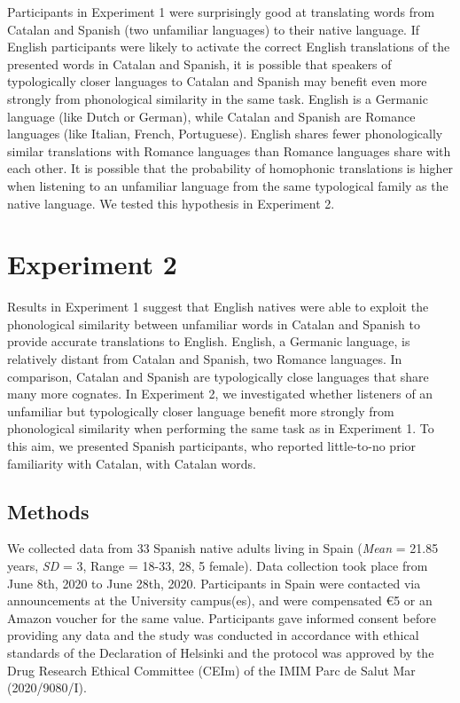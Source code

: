 \documentclass[
]{article}
\begin{document}
Participants in Experiment 1 were surprisingly good at translating words
from Catalan and Spanish (two unfamiliar languages) to their native
language. If English participants were likely to activate the correct
English translations of the presented words in Catalan and Spanish, it
is possible that speakers of typologically closer languages to Catalan
and Spanish may benefit even more strongly from phonological similarity
in the same task. English is a Germanic language (like Dutch or German),
while Catalan and Spanish are Romance languages (like Italian, French,
Portuguese). English shares fewer phonologically similar translations
with Romance languages than Romance languages share with each other. It
is possible that the probability of homophonic translations is higher
when listening to an unfamiliar language from the same typological
family as the native language. We tested this hypothesis in Experiment
2.

\section{Experiment 2}\label{experiment-2}

Results in Experiment 1 suggest that English natives were able to
exploit the phonological similarity between unfamiliar words in Catalan
and Spanish to provide accurate translations to English. English, a
Germanic language, is relatively distant from Catalan and Spanish, two
Romance languages. In comparison, Catalan and Spanish are typologically
close languages that share many more cognates. In Experiment 2, we
investigated whether listeners of an unfamiliar but typologically closer
language benefit more strongly from phonological similarity when
performing the same task as in Experiment 1. To this aim, we presented
Spanish participants, who reported little-to-no prior familiarity with
Catalan, with Catalan words.

\subsection{Methods}\label{methods-1}

We collected data from 33 Spanish native adults living in Spain
(\emph{Mean} = 21.85 years, \emph{SD} = 3, Range = 18-33, 28, 5 female).
Data collection took place from June 8th, 2020 to June 28th, 2020.
Participants in Spain were contacted via announcements at the University
campus(es), and were compensated €5 or an Amazon voucher for the same
value. Participants gave informed consent before providing any data and
the study was conducted in accordance with ethical standards of the
Declaration of Helsinki and the protocol was approved by the Drug
Research Ethical Committee (CEIm) of the IMIM Parc de Salut Mar
(2020/9080/I).
\end{document}
